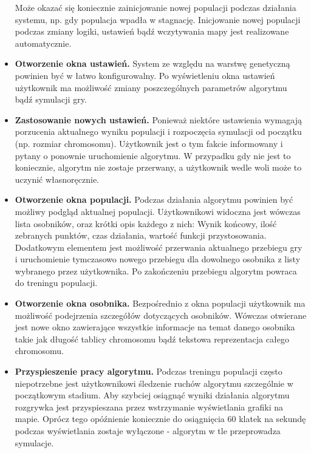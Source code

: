 \begin{itemize}
		\newline
		Może okazać się koniecznie zainicjowanie nowej populacji podczas działania systemu, np. gdy populacja wpadła w stagnację.
		Inicjowanie nowej populacji podczas zmiany logiki, ustawień bądź wczytywania mapy jest realizowane automatycznie.
		\item {\bf Otworzenie okna ustawień.}
		\newline
		System ze względu na warstwę genetyczną powinien być w łatwo konfigurowalny. Po wyświetleniu okna ustawień użytkownik ma możliwość zmiany
		poszczególnych parametrów algorytmu bądź symulacji gry.
		\item {\bf Zastosowanie nowych ustawień. }
		\newline
		Ponieważ niektóre ustawienia wymagają porzucenia aktualnego wyniku populacji i rozpoczęcia symulacji od początku (np. rozmiar chromosomu).
		Użytkownik jest o tym fakcie informowany i pytany o ponownie uruchomienie algorytmu. 
		W przypadku gdy nie jest to koniecznie, algorytm nie zostaje przerwany, a użytkownik wedle woli może to uczynić własnoręcznie.
		\item {\bf Otworzenie okna populacji. }
		\newline
		Podczas działania algorytmu powinien być możliwy podgląd aktualnej populacji. Użytkownikowi widoczna jest wówczas lista osobników, oraz krótki opis każdego z nich:
		Wynik końcowy, ilość zebranych punktów, czas działania, wartość funkcji przystosowania. Dodatkowym elementem jest możliwość przerwania aktualnego przebiegu gry i uruchomienie tymczasowo nowego przebiegu dla dowolnego osobnika z listy wybranego przez użytkownika. Po zakończeniu przebiegu algorytm powraca do treningu populacji.
		\item {\bf Otworzenie okna osobnika. }
		\newline
		Bezpośrednio z okna populacji użytkownik ma możliwość podejrzenia szczegółów dotyczących osobników. Wówczas otwierane jest nowe okno zawierające wszystkie informacje na temat danego osobnika takie jak długość tablicy chromosomu bądź tekstowa reprezentacja całego chromosomu.		
		\item {\bf Przyspieszenie pracy algorytmu.}
		\newline
		Podczas treningu populacji często niepotrzebne jest użytkownikowi śledzenie ruchów algorytmu szczególnie w początkowym stadium. Aby szybciej osiągnąć wyniki działania algorytmu rozgrywka jest przyspieszana przez wstrzymanie wyświetlania grafiki na mapie. Oprócz tego opóźnienie koniecznie do osiągnięcia 60 klatek na sekundę podczas wyświetlania zostaje wyłączone - algorytm w tle przeprowadza symulacje.
	\end{itemize}
